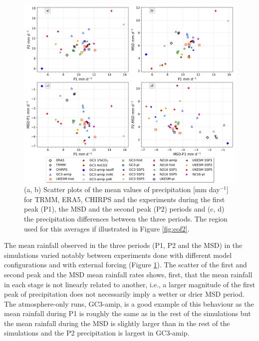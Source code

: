 \label{sq:msdclim}
 \begin{figure}[t!]
\includegraphics[width=\linewidth]{figures/dumscatter_2.png}
\caption[Scatter plot of mean precipitation in different parts of seasonal cycle]{(a, b) Scatter plots of the mean values of precipitation [mm day$^{-1}$] for TRMM, ERA5, CHIRPS and the experiments during the first peak (P1), the MSD and the second peak (P2) periods and (c, d) the precipitation differences between the three periods. The region used for this averages if illustrated in Figure \ref{fig:eof2}.  
  }
\label{fig:scatter_msd}
\end{figure} 

The mean rainfall observed in the three periods (P1, P2 and the MSD) in the simulations varied notably between experiments done with different model configurations and with external forcing (Figure \ref{fig:scatter_msd}). 
 The scatter of the first and second peak and the MSD mean rainfall rates  shows, first, that the mean rainfall in each stage is not linearly related to another, i.e., a larger magnitude of the first peak of precipitation does not necessarily imply a wetter or drier MSD period. The atmosphere-only runs, GC3-amip, is a good example of this behaviour as the mean rainfall during P1 is roughly the same as in the rest of the simulations but the mean rainfall during the MSD is slightly larger than in the rest of the simulations and the P2 precipitation is largest in GC3-amip. 
 
